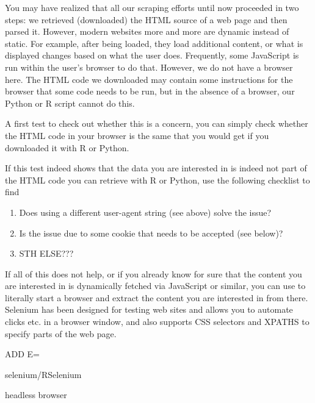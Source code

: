 You may have realized that all our scraping efforts until now proceeded in two steps: we retrieved (downloaded) the HTML source of a web page and then parsed it. However, modern websites more and more are dynamic instead of static. For example, after being loaded, they load additional content, or what is displayed changes based on what the user does. Frequently, some JavaScript is run within the user's browser to do that. However, we do not have a browser here. The HTML code we downloaded may contain some instructions for the browser that some code needs to be run, but in the absence of a browser, our Python or R script cannot do this.

A first test to check out whether this is a concern, you can simply check whether the HTML code in your browser is the same that you would get if you downloaded it with R or Python.



If this test indeed shows that the data you are interested in is indeed not part of the HTML code you can retrieve with R or Python, use the following checklist to find 

\begin{enumerate}
\item Does using a different user-agent string (see above) solve the issue?
\item Is the issue due to some cookie that needs to be accepted (see below)?
\item STH ELSE???
\end{enumerate}

If all of this does not help, or if you already know for sure that the content you are interested in is dynamically fetched via JavaScript or similar, you can use  to literally start a browser and extract the content you are interested in from there. Selenium has been designed for testing web sites and allows you to automate clicks etc. in a browser window, and also supports CSS selectors and XPATHS to specify parts of the web page.

ADD E=

selenium/RSelenium


headless browser
